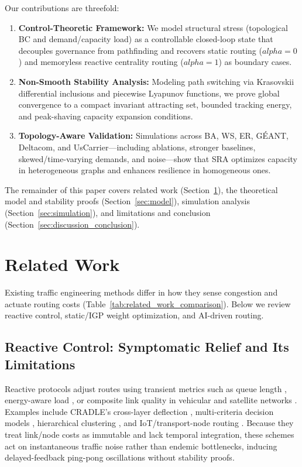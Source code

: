 \documentclass{ccjnl}
\newcommand{\rev}[1]{{\color{blue}#1}}
\def\rev#1{#1}%
\def\alpha{alpha}%
\begin{document}
Our contributions are threefold:
\begin{enumerate}
    \item \textbf{Control-Theoretic Framework:} We model structural stress \rev{(topological BC and demand/capacity load)} as a controllable closed-loop state that decouples governance from pathfinding and recovers static routing \rev{($\alpha=0$) and memoryless reactive centrality routing ($\alpha=1$)} as boundary cases.
    \item \textbf{Non-Smooth Stability Analysis:} Modeling path switching via Krasovskii differential inclusions and piecewise Lyapunov functions, we prove \rev{global convergence to a compact invariant attracting set, bounded tracking energy, and peak-shaving capacity expansion conditions}.
    \item \textbf{Topology-Aware \rev{Validation}:} Simulations \rev{across BA, WS, ER, G\'EANT, Deltacom, and UsCarrier---including ablations, stronger baselines, skewed/time-varying demands, and noise---}show that SRA optimizes capacity in heterogeneous graphs and enhances resilience in homogeneous ones.
\end{enumerate}

The remainder of this paper covers related work (Section~\ref{sec:related_work}), the theoretical model and stability proofs (Section~\ref{sec:model}), simulation analysis (Section~\ref{sec:simulation}), and limitations and conclusion (Section~\ref{sec:discussion_conclusion}).




\section{Related Work}
\label{sec:related_work}

Existing traffic engineering methods differ in how they sense congestion and actuate routing costs (Table~\ref{tab:related_work_comparison}). Below we review reactive control, static/IGP weight optimization, and AI-driven routing.

\subsection{Reactive Control: Symptomatic Relief and Its Limitations}

Reactive protocols adjust routes using transient metrics such as queue length \cite{Macabale2020Cradle}, energy-aware load \cite{SM2025Novel}, or composite link quality in vehicular and satellite networks \cite{Wang2025VANET, Fu2024SatelliteBC,wang2022cdmr}. Examples include CRADLE's cross-layer deflection \cite{Macabale2020Cradle}, multi-criteria decision models \cite{Fouad2014MultiCriteria}, hierarchical clustering \cite{Guizani2011Hierarchical}, and IoT/transport-node routing \cite{Darabkh2025SmartCity, Aditya2020ClosenessCluster, Wu2024RailwayNode,ma2022traffic}. Because they treat link/node costs as immutable and lack temporal integration, these schemes act on instantaneous traffic noise rather than endemic bottlenecks, inducing delayed-feedback ping-pong oscillations without stability proofs.
\end{document}
